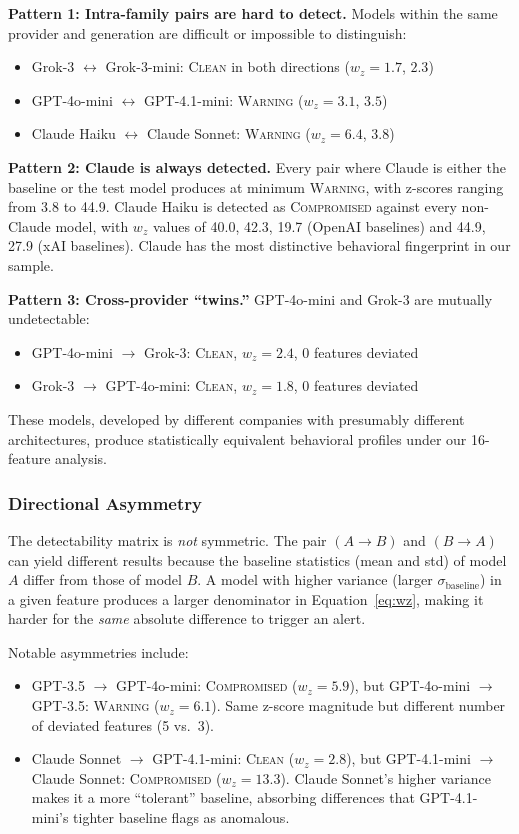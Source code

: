 \documentclass[11pt,twocolumn]{article}
\begin{document}
\textbf{Pattern 1: Intra-family pairs are hard to detect.}
Models within the same provider and generation are difficult or impossible to distinguish:
\begin{itemize}[nosep]
    \item Grok-3 $\leftrightarrow$ Grok-3-mini: \textsc{Clean} in both directions ($w_z = 1.7$, $2.3$)
    \item GPT-4o-mini $\leftrightarrow$ GPT-4.1-mini: \textsc{Warning} ($w_z = 3.1$, $3.5$)
    \item Claude Haiku $\leftrightarrow$ Claude Sonnet: \textsc{Warning} ($w_z = 6.4$, $3.8$)
\end{itemize}

\textbf{Pattern 2: Claude is always detected.}
Every pair where Claude is either the baseline or the test model produces at minimum \textsc{Warning}, with z-scores ranging from 3.8 to 44.9.
Claude Haiku is detected as \textsc{Compromised} against every non-Claude model, with $w_z$ values of 40.0, 42.3, 19.7 (OpenAI baselines) and 44.9, 27.9 (xAI baselines).
Claude has the most distinctive behavioral fingerprint in our sample.

\textbf{Pattern 3: Cross-provider ``twins.''}
GPT-4o-mini and Grok-3 are mutually undetectable:
\begin{itemize}[nosep]
    \item GPT-4o-mini $\to$ Grok-3: \textsc{Clean}, $w_z = 2.4$, 0 features deviated
    \item Grok-3 $\to$ GPT-4o-mini: \textsc{Clean}, $w_z = 1.8$, 0 features deviated
\end{itemize}
These models, developed by different companies with presumably different architectures, produce statistically equivalent behavioral profiles under our 16-feature analysis.

\subsubsection{Directional Asymmetry}

The detectability matrix is \emph{not} symmetric.
The pair $(A \to B)$ and $(B \to A)$ can yield different results because the baseline statistics (mean and std) of model $A$ differ from those of model $B$.
A model with higher variance (larger $\sigma_{\text{baseline}}$) in a given feature produces a larger denominator in Equation~\ref{eq:wz}, making it harder for the \emph{same} absolute difference to trigger an alert.

Notable asymmetries include:
\begin{itemize}[nosep]
    \item GPT-3.5 $\to$ GPT-4o-mini: \textsc{Compromised} ($w_z = 5.9$), but GPT-4o-mini $\to$ GPT-3.5: \textsc{Warning} ($w_z = 6.1$).
    Same z-score magnitude but different number of deviated features (5 vs.\ 3).
    \item Claude Sonnet $\to$ GPT-4.1-mini: \textsc{Clean} ($w_z = 2.8$), but GPT-4.1-mini $\to$ Claude Sonnet: \textsc{Compromised} ($w_z = 13.3$).
    Claude Sonnet's higher variance makes it a more ``tolerant'' baseline, absorbing differences that GPT-4.1-mini's tighter baseline flags as anomalous.
\end{itemize}
\end{document}
